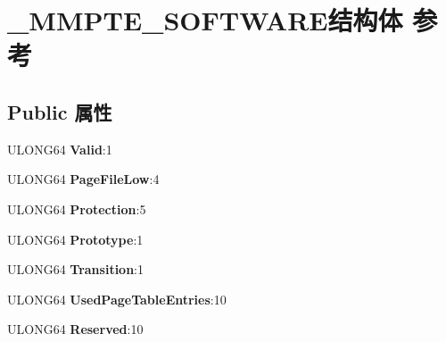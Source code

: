 \hypertarget{struct___m_m_p_t_e___s_o_f_t_w_a_r_e}{}\section{\+\_\+\+M\+M\+P\+T\+E\+\_\+\+S\+O\+F\+T\+W\+A\+R\+E结构体 参考}
\label{struct___m_m_p_t_e___s_o_f_t_w_a_r_e}
\subsection*{Public 属性}
\begin{DoxyCompactItemize}
\item 
\mbox{\label{struct___m_m_p_t_e___s_o_f_t_w_a_r_e_a2c14b16b6fc4b3db172eb50adb116cbb}} 
U\+L\+O\+N\+G64 {\bfseries Valid}\+:1
\item 
\mbox{\label{struct___m_m_p_t_e___s_o_f_t_w_a_r_e_affc821816a9245bb1bfd3f2e609ad635}} 
U\+L\+O\+N\+G64 {\bfseries Page\+File\+Low}\+:4
\item 
\mbox{\label{struct___m_m_p_t_e___s_o_f_t_w_a_r_e_a965728ea251de32af5ef234928eeafd1}} 
U\+L\+O\+N\+G64 {\bfseries Protection}\+:5
\item 
\mbox{\label{struct___m_m_p_t_e___s_o_f_t_w_a_r_e_a9de76d03aeb2fa601bf15882c3f5d170}} 
U\+L\+O\+N\+G64 {\bfseries Prototype}\+:1
\item 
\mbox{\label{struct___m_m_p_t_e___s_o_f_t_w_a_r_e_a7127e997d8b491cb8224feaf1759735d}} 
U\+L\+O\+N\+G64 {\bfseries Transition}\+:1
\item 
\mbox{\label{struct___m_m_p_t_e___s_o_f_t_w_a_r_e_a417b1844aaa98a6ac7cd8192a79e70f7}} 
U\+L\+O\+N\+G64 {\bfseries Used\+Page\+Table\+Entries}\+:10
\item 
\mbox{\label{struct___m_m_p_t_e___s_o_f_t_w_a_r_e_ade9cac6fa1e1a9c078a852f7aa85c7f7}} 
U\+L\+O\+N\+G64 {\bfseries Reserved}\+:10
\item 
\mbox{\label{struct___m_m_p_t_e___s_o_f_t_w_a_r_e_ac3e4af3e9790f8d7cb80566f6caf448c}} 

\end{DoxyCompactItemize}
